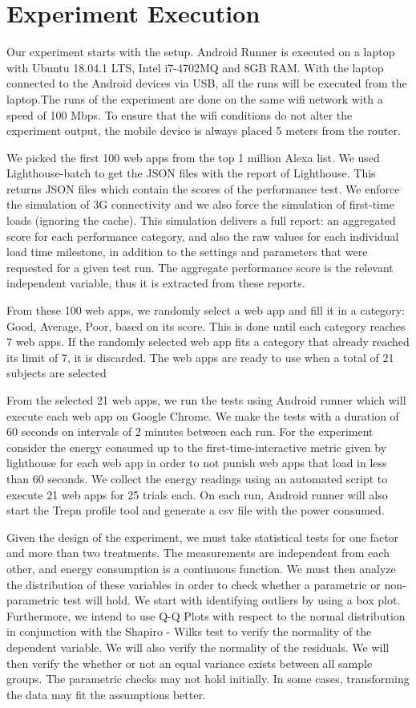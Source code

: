 \section{Experiment Execution}
Our experiment starts with the setup. Android Runner is executed on a laptop with Ubuntu 18.04.1 LTS, Intel i7-4702MQ and 8GB RAM. With the laptop connected to the Android devices via USB, all the runs will be executed from the laptop.The runs of the experiment are done on the same wifi network with a speed of 100 Mbps. To ensure that the wifi conditions do not alter the experiment output, the mobile device is always placed 5 meters from the router.

We picked the first 100 web apps from the top 1 million Alexa list. We used Lighthouse-batch to get the JSON files with the report of Lighthouse. This returns JSON files which contain the scores of the performance test. We enforce the simulation of 3G connectivity and we also force the simulation of first-time loads (ignoring the cache). This simulation delivers a full report: an aggregated score for each performance category, and also the raw values for each individual load time milestone, in addition to the settings and parameters that were requested for a given test run. The aggregate performance score is the relevant independent variable, thus it is extracted from these reports. 

From these 100 web apps, we randomly select a web app and fill it in a category: Good, Average, Poor, based on its score. This is done until each category reaches 7 web apps. If the randomly selected web app fits a category that already reached its limit of 7, it is discarded. The web apps are ready to use when a total of 21 subjects are selected

From the selected 21 web apps, we run the tests using Android runner which will execute each web app on Google Chrome. We make the tests with a duration of 60 seconds on intervals of 2 minutes between each run. For the experiment consider the energy consumed up to the first-time-interactive metric given by lighthouse for each web app in order to not punish web apps that load in less than 60 seconds.  We collect the energy readings using an automated script to execute 21 web apps for 25 trials each. On each run, Android runner will also start the Trepn profile tool and generate a csv file with the power consumed. 
 
Given the design of the experiment, we must take statistical tests for one factor and more than two treatments. The measurements are independent from each other, and energy consumption is a continuous function. We must then analyze  the distribution of these variables in order to check whether a parametric or non-parametric test will hold.  We start with identifying outliers by using a box plot. Furthermore, we intend to use Q-Q Plots with respect to the normal distribution in conjunction with the Shapiro - Wilks test to verify the normality of the dependent variable. We will also verify the normality of the residuals. We will then verify the whether or not an equal variance exists between all sample groups. The parametric checks may not hold initially. In some cases, transforming the data may fit the assumptions better. 

